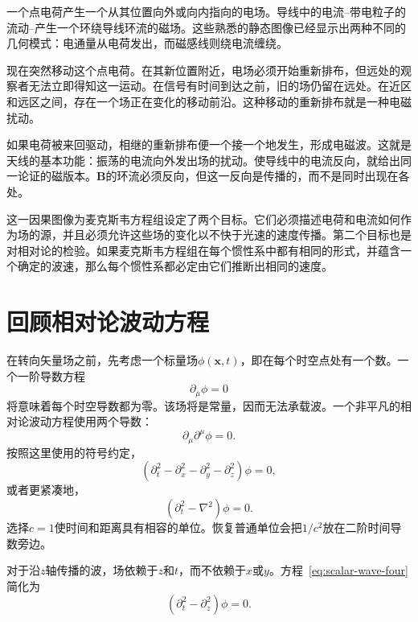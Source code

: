 一个点电荷产生一个从其位置向外或向内指向的电场。导线中的电流--带电粒子的流动--产生一个环绕导线环流的磁场。这些熟悉的静态图像已经显示出两种不同的几何模式：电通量从电荷发出，而磁感线则绕电流缠绕。

现在突然移动这个点电荷。在其新位置附近，电场必须开始重新排布，但远处的观察者无法立即得知这一运动。在信号有时间到达之前，旧的场仍留在远处。在近区和远区之间，存在一个场正在变化的移动前沿。这种移动的重新排布就是一种电磁扰动。

如果电荷被来回驱动，相继的重新排布便一个接一个地发生，形成电磁波。这就是天线的基本功能：振荡的电流向外发出场的扰动。使导线中的电流反向，就给出同一论证的磁版本。\(\mathbf B\)的环流必须反向，但这一反向是传播的，而不是同时出现在各处。

这一因果图像为麦克斯韦方程组设定了两个目标。它们必须描述电荷和电流如何作为场的源，并且必须允许这些场的变化以不快于光速的速度传播。第二个目标也是对相对论的检验。如果麦克斯韦方程组在每个惯性系中都有相同的形式，并蕴含一个确定的波速，那么每个惯性系都必定由它们推断出相同的速度。

\section{回顾相对论波动方程}

在转向矢量场之前，先考虑一个标量场\(\phi(\mathbf x,t)\)，即在每个时空点处有一个数。一个一阶导数方程
\begin{equation}
\partial_\mu\phi=0
\end{equation}
将意味着每个时空导数都为零。该场将是常量，因而无法承载波。一个非平凡的相对论波动方程使用两个导数：
\begin{equation}
\partial_\mu\partial^\mu\phi=0.
\end{equation}
按照这里使用的符号约定，
\begin{equation}
\left(\partial_t^2-\partial_x^2-\partial_y^2-\partial_z^2\right)\phi=0,
\label{eq:scalar-wave-four}
\end{equation}
或者更紧凑地，
\begin{equation}
\left(\partial_t^2-\nabla^2\right)\phi=0.
\end{equation}
选择\(c=1\)使时间和距离具有相容的单位。恢复普通单位会把\(1/c^2\)放在二阶时间导数旁边。

对于沿\(z\)轴传播的波，场依赖于\(z\)和\(t\)，而不依赖于\(x\)或\(y\)。方程~\eqref{eq:scalar-wave-four}简化为
\begin{equation}
\left(\partial_t^2-\partial_z^2\right)\phi=0.
\label{eq:scalar-wave-one}
\end{equation}

